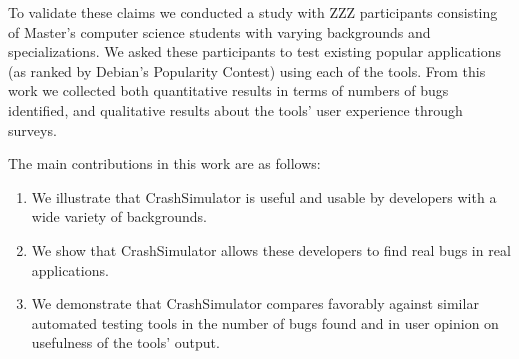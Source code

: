 To validate these claims we conducted a study with ZZZ participants
consisting of Master's computer science students with varying backgrounds
and specializations.  We asked these participants to test existing popular
applications (as ranked by Debian's Popularity Contest) using each of the
tools.  From this work we collected both quantitative results in terms of
numbers of bugs identified, and qualitative results about the tools' user
experience through surveys.

The main contributions in this work are as follows:
\begin{enumerate}

\item We illustrate that CrashSimulator is useful and usable by developers
with a wide variety of backgrounds.

\item We show that CrashSimulator allows these developers to find real bugs
in real applications.

\item We demonstrate that CrashSimulator compares favorably against similar
automated testing tools in the number of bugs found and in user opinion on
usefulness of the tools' output.

\end{enumerate}
